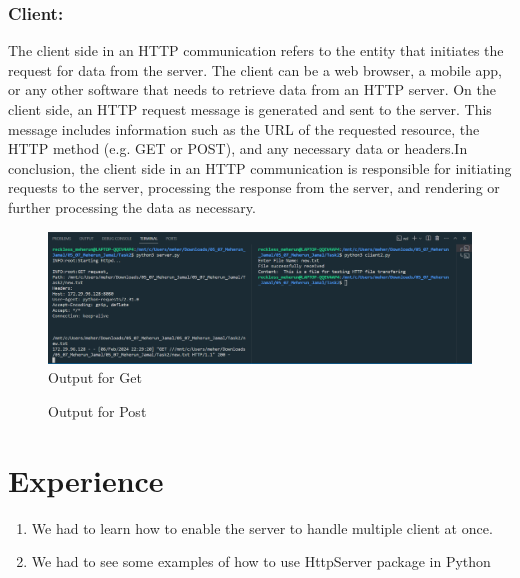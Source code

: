 \documentclass[11pt]{article}
\begin{document}
\subsubsection{Client: }
The client side in an HTTP communication refers to the entity that initiates the request for data
from the server. The client can be a web browser, a mobile app, or any other software that needs to
retrieve data from an HTTP server. On the client side, an HTTP request message is generated and
sent to the server. This message includes information such as the URL of the requested resource,
the HTTP method (e.g. GET or POST), and any necessary data or headers.In conclusion, the client
side in an HTTP communication is responsible for initiating requests to the server, processing the
response from the server, and rendering or further processing the data as necessary.

\begin{figure}[H]
    \centering
    \includegraphics[scale=0.3]{Task2/T2_Get.png} 
    \caption{Output for Get}
    \label{fig: Output for Option 3}
\end{figure}

\begin{figure}[ht]
    \centering
    \caption{Output for Post}
    \label{fig: Output for Option 3}
\end{figure}

\newpage
\section{Experience}
\begin{enumerate}
\item We had to learn how to enable the server to handle multiple client at once.
\item We had to see some examples of how to use HttpServer package in Python
\end{enumerate}



\nocite{*}
\end{document}
